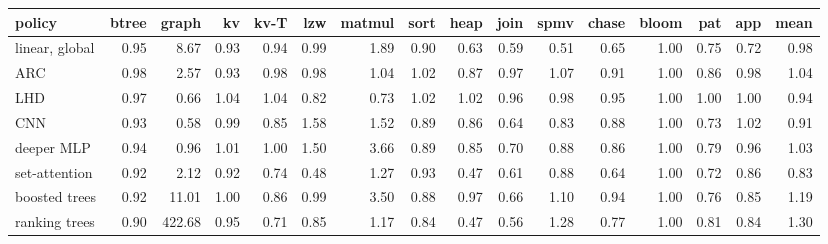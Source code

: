 \begin{tabular}{lrrrrrrrrrrrrrrr}
\toprule
policy & btree & graph & kv & kv-T & lzw & matmul & sort & heap & join & spmv & chase & bloom & pat & app & mean \\
\midrule
linear, global & 0.95 & 8.67 & 0.93 & 0.94 & 0.99 & 1.89 & 0.90 & 0.63 & 0.59 & 0.51 & 0.65 & 1.00 & 0.75 & 0.72 & 0.98 \\
ARC & 0.98 & 2.57 & 0.93 & 0.98 & 0.98 & 1.04 & 1.02 & 0.87 & 0.97 & 1.07 & 0.91 & 1.00 & 0.86 & 0.98 & 1.04 \\
LHD & 0.97 & 0.66 & 1.04 & 1.04 & 0.82 & 0.73 & 1.02 & 1.02 & 0.96 & 0.98 & 0.95 & 1.00 & 1.00 & 1.00 & 0.94 \\
CNN & 0.93 & 0.58 & 0.99 & 0.85 & 1.58 & 1.52 & 0.89 & 0.86 & 0.64 & 0.83 & 0.88 & 1.00 & 0.73 & 1.02 & 0.91 \\
deeper MLP & 0.94 & 0.96 & 1.01 & 1.00 & 1.50 & 3.66 & 0.89 & 0.85 & 0.70 & 0.88 & 0.86 & 1.00 & 0.79 & 0.96 & 1.03 \\
set-attention & 0.92 & 2.12 & 0.92 & 0.74 & 0.48 & 1.27 & 0.93 & 0.47 & 0.61 & 0.88 & 0.64 & 1.00 & 0.72 & 0.86 & 0.83 \\
boosted trees & 0.92 & 11.01 & 1.00 & 0.86 & 0.99 & 3.50 & 0.88 & 0.97 & 0.66 & 1.10 & 0.94 & 1.00 & 0.76 & 0.85 & 1.19 \\
ranking trees & 0.90 & 422.68 & 0.95 & 0.71 & 0.85 & 1.17 & 0.84 & 0.47 & 0.56 & 1.28 & 0.77 & 1.00 & 0.81 & 0.84 & 1.30 \\
\bottomrule
\end{tabular}
